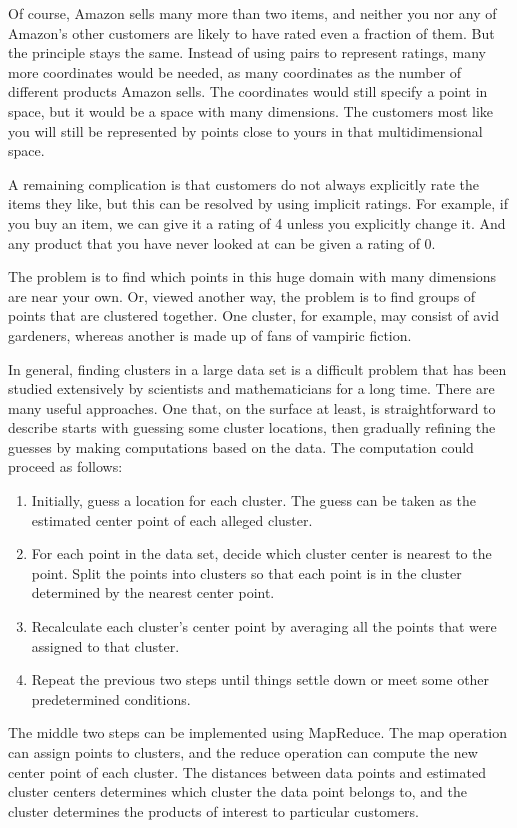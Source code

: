 Of course, Amazon sells many more than two items, and neither you nor any
of Amazon's other customers are likely to have rated even a fraction of them.
But the principle stays the same.  Instead of using pairs to represent
ratings, many more coordinates would be needed, as many coordinates
as the number of different products Amazon sells.
The coordinates would still specify a point in space,
but it would be a space with many dimensions.
The customers most like you will still be represented by points close to yours
in that multidimensional space.

A remaining complication is that customers do not always explicitly rate the
items they like, but this can be resolved by using implicit ratings.
For example, if you buy an item, we can give it a rating of 4 unless you
explicitly change it.  And any product that you have never looked at
can be given a rating of 0.

The problem is to find which points in this huge domain with many dimensions
are near your own. Or, viewed another way, the problem is to find groups of
points that are clustered together. One cluster, for example, may consist of
avid gardeners, whereas another is made up of fans of vampiric fiction.

In general, finding clusters
in a large data set is a difficult problem
that has been studied extensively
by scientists and mathematicians for a long time.
There are many useful approaches.  One that, on the surface at least,
is straightforward to describe starts with guessing some cluster locations,
then gradually refining the guesses by making computations based on the data.
The computation could proceed as follows:
\label{cluster-process}
\begin{enumerate}
    \item Initially, guess a location for each cluster. The guess can be
        taken as the estimated center point of each alleged cluster.
    \item For each point in the data set, decide which cluster center is nearest
        to the point.  Split the points into clusters so that each point is
        in the cluster determined by the nearest center point.
    \item Recalculate each cluster's center point by averaging all the
        points that were assigned to that cluster.
    \item Repeat the previous two steps until things settle down or meet
        some other predetermined conditions.
\end{enumerate}
The middle two steps can be implemented using MapReduce.  The map operation can
assign points to clusters, and the reduce operation can compute the new center
point of each cluster.  The distances between data points
and estimated cluster centers determines which cluster the data point belongs to,
and the cluster determines the products of interest to particular customers.

